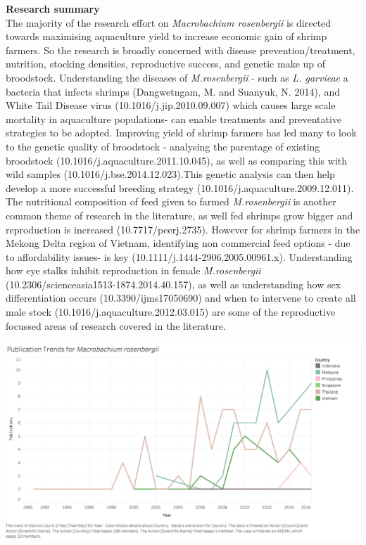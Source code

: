\documentclass[]{book}
\theoremstyle{definition}
\theoremstyle{definition}
\theoremstyle{definition}
\theoremstyle{remark}
\begin{document}
\textbf{Research summary}\\
The majority of the research effort on \emph{Macrobachium rosenbergii}
is directed towards maximising aquaculture yield to increase economic
gain of shrimp farmers. So the research is broadly concerned with
disease prevention/treatment, nutrition, stocking densities,
reproductive success, and genetic make up of broodstock. Understanding
the diseases of \emph{M.rosenbergii} - such as \emph{L. garvieae} a
bacteria that infects shrimps (Dangwetngam, M. and Suanyuk, N. 2014),
and White Tail Disease virus (10.1016/j.jip.2010.09.007) which causes
large scale mortality in aquaculture populations- can enable treatments
and preventative strategies to be adopted. Improving yield of shrimp
farmers has led many to look to the genetic quality of broodstock -
analysing the parentage of existing broodstock
(10.1016/j.aquaculture.2011.10.045), as well as comparing this with wild
samples (10.1016/j.bse.2014.12.023).This genetic analysis can then help
develop a more successful breeding strategy
(10.1016/j.aquaculture.2009.12.011). The nutritional composition of feed
given to farmed \emph{M.rosenbergii} is another common theme of research
in the literature, as well fed shrimps grow bigger and reproduction is
increased (10.7717/peerj.2735). However for shrimp farmers in the Mekong
Delta region of Vietnam, identifying non commercial feed options - due
to affordability issues- is key (10.1111/j.1444-2906.2005.00961.x).
Understanding how eye stalks inhibit reproduction in female
\emph{M.rosenbergii} (10.2306/scienceasia1513-1874.2014.40.157), as well
as understanding how sex differentiation occurs (10.3390/ijms17050690)
and when to intervene to create all male stock
(10.1016/j.aquaculture.2012.03.015) are some of the reproductive
focussed areas of research covered in the literature.

\includegraphics{images_species/Publication trend for Macrobachium rosenbergii.png}
\end{document}

